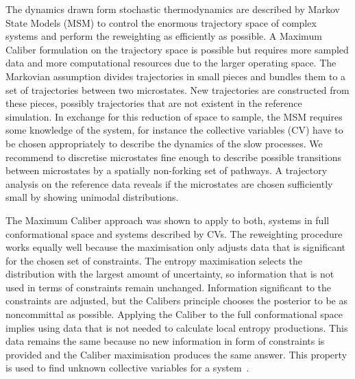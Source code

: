 \documentclass[12pt]{report}
\begin{document}
The dynamics drawn form stochastic thermodynamics are described by Markov State Models (MSM) to control the enormous trajectory space of complex systems and perform the reweighting as efficiently as possible. A Maximum Caliber formulation on the trajectory space is possible but requires more sampled data and more computational resources due to the larger operating space. The Markovian assumption divides trajectories in small pieces and bundles them to a set of trajectories between two microstates. New trajectories are constructed from these pieces, possibly trajectories that are not existent in the reference simulation. In exchange for this reduction of space to sample, the MSM requires some knowledge of the system, for instance the collective variables (CV) have to be chosen appropriately to describe the dynamics of the slow processes. We recommend to discretise microstates fine enough to describe possible transitions between microstates by a spatially non-forking set of pathways. A trajectory analysis on the reference data reveals if the microstates are chosen sufficiently small by showing unimodal distributions. 

The Maximum Caliber approach was shown to apply to both, systems in full conformational space and systems described by CVs. The reweighting procedure works equally well because the maximisation only adjusts data that is significant for the chosen set of constraints. The entropy maximisation selects the distribution with the largest amount of uncertainty, so information that is not used in terms of constraints remain unchanged. Information significant to the constraints are adjusted, but the Calibers principle chooses the posterior to be as noncommittal as possible. Applying the Caliber to the full conformational space implies using data that is not needed to calculate local entropy productions. This data remains the same because no new information in form of constraints is provided and the Caliber maximisation produces the same answer. This property is used to find unknown collective variables for a system~\cite{smith2018multi, tiwary2016spectral}. 
\end{document}
